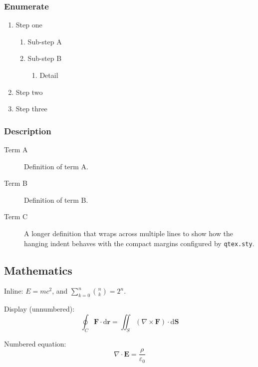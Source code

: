 \documentclass[sans,oneside,numeric,raggedright]{qarticle}
\begin{document}
\subsubsection{Enumerate}

\begin{enumerate}
  \item Step one
    \begin{enumerate}
      \item Sub-step A
      \item Sub-step B
        \begin{enumerate}
          \item Detail
        \end{enumerate}
    \end{enumerate}
  \item Step two
  \item Step three
\end{enumerate}

\subsubsection{Description}

\begin{description}
  \item[Term A] Definition of term A.
  \item[Term B] Definition of term B.
  \item[Term C] A longer definition that wraps across multiple lines to
    show how the hanging indent behaves with the compact margins configured
    by \texttt{qtex.sty}.
\end{description}

\subsection{Mathematics}

Inline: $E = mc^2$, and $\sum_{k=0}^{n}\binom{n}{k} = 2^n$.

Display (unnumbered):
\begin{displaymath}
  \oint_C \mathbf{F}\cdot\mathrm{d}\mathbf{r}
  = \iint_S (\nabla\times\mathbf{F})\cdot\mathrm{d}\mathbf{S}
\end{displaymath}

Numbered equation:
\begin{equation}\label{eq:gauss}
  \nabla\cdot\mathbf{E} = \frac{\rho}{\varepsilon_0}
\end{equation}
\end{document}
